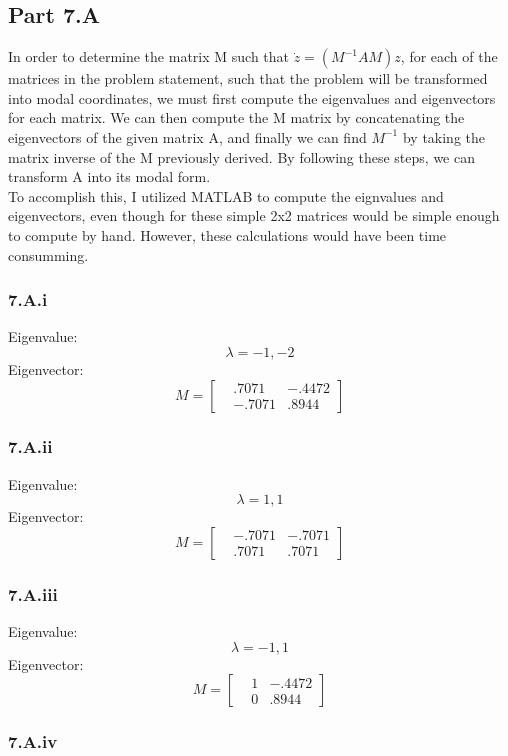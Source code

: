 \documentclass[12px]{article}
\begin{document}
\subsection*{Part 7.A}
In order to determine the matrix M such that $\dot{z} = \left(M^{-1}AM \right)z$, for each of the matrices in the problem statement, such that the problem will be transformed into modal coordinates, we must first compute the eigenvalues and eigenvectors for each matrix. We can then compute the M matrix by concatenating the eigenvectors of the given matrix A, and finally we can find $M^{-1}$ by taking the matrix inverse of the M previously derived. By following these steps, we can transform A into its modal form. \\

To accomplish this, I utilized MATLAB to compute the eignvalues and eigenvectors, even though for these simple 2x2 matrices would be simple enough to compute by hand. However, these calculations would have been time consumming.

\subsubsection*{7.A.i}

Eigenvalue:
$$ \lambda = -1, -2 $$
Eigenvector:
$$M =
\begin{bmatrix}
    & .7071 & -.4472 \\
    & -.7071 & .8944
\end{bmatrix}
$$


\subsubsection*{7.A.ii}

Eigenvalue:
$$ \lambda = 1, 1 $$
Eigenvector:
$$M =
\begin{bmatrix}
    & -.7071 & -.7071 \\
    & .7071 & .7071
\end{bmatrix}
$$
\subsubsection*{7.A.iii}

Eigenvalue:
$$ \lambda = -1, 1 $$
Eigenvector:
$$M =
\begin{bmatrix}
    & 1 & -.4472 \\
    & 0 & .8944
\end{bmatrix}
$$
\subsubsection*{7.A.iv}
\end{document}
